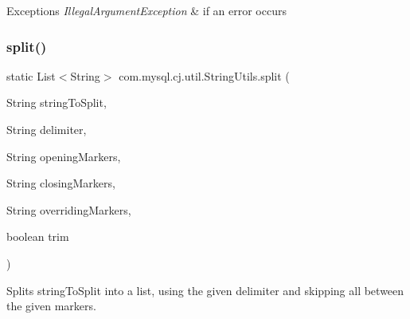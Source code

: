 \begin{DoxyExceptions}{Exceptions}
{\em Illegal\+Argument\+Exception} & if an error occurs \\
\hline
\end{DoxyExceptions}
\mbox{\label{classcom_1_1mysql_1_1cj_1_1util_1_1_string_utils_a02cfd394f6f8bd6ec2a5e4e8541ae2bc}} 
\subsubsection{\texorpdfstring{split()}{split()}\hspace{0.1cm}{\footnotesize\ttfamily [4/5]}}
{\footnotesize\ttfamily static List$<$String$>$ com.\+mysql.\+cj.\+util.\+String\+Utils.\+split (\begin{DoxyParamCaption}\item[{String}]{string\+To\+Split,  }\item[{String}]{delimiter,  }\item[{String}]{opening\+Markers,  }\item[{String}]{closing\+Markers,  }\item[{String}]{overriding\+Markers,  }\item[{boolean}]{trim }\end{DoxyParamCaption})\hspace{0.3cm}{\ttfamily [static]}}

Splits string\+To\+Split into a list, using the given delimiter and skipping all between the given markers.


